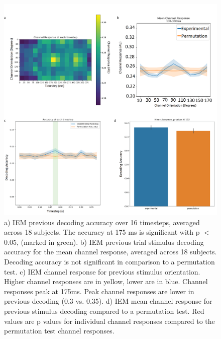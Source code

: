 \documentclass[../main.tex]{subfiles}
\begin{document}
\begin{figure}
    \centering
    \includegraphics[scale=0.7]{figures/results/iem_results_prev.png}
    \caption{a) IEM previous decoding accuracy over 16 timesteps, averaged across 18 subjects. The accuracy at 175 ms is significant with p $<$ 0.05, (marked in green). b) IEM previous trial stimulus decoding accuracy for the mean channel response, averaged across 18 subjects. Decoding accuracy is not significant in comparison to a permutation test. c) IEM channel response for previous stimulus orientation. Higher channel responses are in yellow, lower are in blue. Channel responses peak at 175ms. Peak channel responses are lower in previous decoding (0.3 vs. 0.35). d) IEM mean channel response for previous stimulus decoding compared to a permutation test. Red values are p values for individual channel responses compared to the permutation test channel responses.}
    \label{iem_results_prev}
\end{figure}
\end{document}
